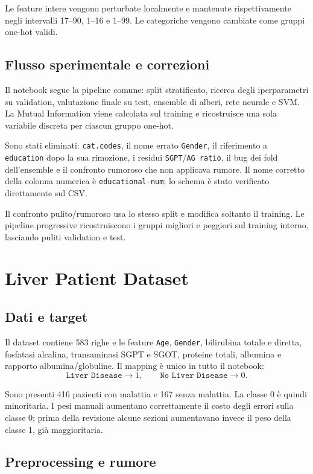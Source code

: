 \documentclass[11pt,a4paper]{article}
\begin{document}
Le feature intere vengono perturbate localmente e mantenute rispettivamente negli intervalli 17--90, 1--16 e 1--99. Le categoriche vengono cambiate come gruppi one-hot validi.

\subsection{Flusso sperimentale e correzioni}

Il notebook segue la pipeline comune: split stratificato, ricerca degli iperparametri su validation, valutazione finale su test, ensemble di alberi, rete neurale e SVM. La Mutual Information viene calcolata sul training e ricostruisce una sola variabile discreta per ciascun gruppo one-hot.

Sono stati eliminati: \texttt{cat.codes}, il nome errato \texttt{Gender}, il riferimento a \texttt{education} dopo la sua rimozione, i residui \texttt{SGPT}/\texttt{AG ratio}, il bug dei fold dell'ensemble e il confronto rumoroso che non applicava rumore. Il nome corretto della colonna numerica è \texttt{educational-num}; lo schema è stato verificato direttamente sul CSV.

Il confronto pulito/rumoroso usa lo stesso split e modifica soltanto il training. Le pipeline progressive ricostruiscono i gruppi migliori e peggiori sul training interno, lasciando puliti validation e test.

\section{Liver Patient Dataset}

\subsection{Dati e target}

Il dataset contiene 583 righe e le feature \texttt{Age}, \texttt{Gender}, bilirubina totale e diretta, fosfatasi alcalina, transaminasi SGPT e SGOT, proteine totali, albumina e rapporto albumina/globuline. Il mapping è unico in tutto il notebook:
\[
\texttt{Liver Disease}\to1, \qquad \texttt{No Liver Disease}\to0.
\]

Sono presenti 416 pazienti con malattia e 167 senza malattia. La classe 0 è quindi minoritaria. I pesi manuali aumentano correttamente il costo degli errori sulla classe 0; prima della revisione alcune sezioni aumentavano invece il peso della classe 1, già maggioritaria.

\subsection{Preprocessing e rumore}
\end{document}
